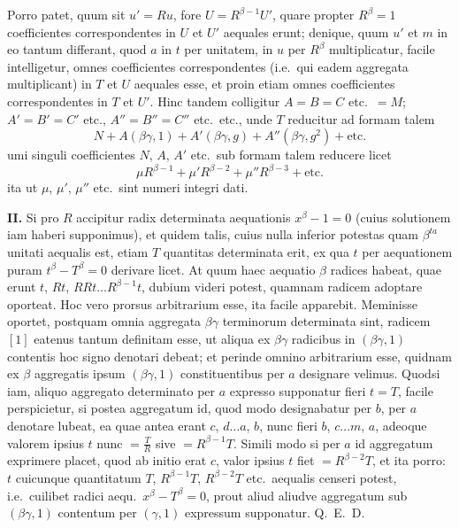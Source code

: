 \documentclass[12pt,a4paper]{article}
\theoremstyle{plain}
\theoremstyle{definition}
\theoremstyle{remark}
\begin{document}
Porro patet, quum sit $u' = Ru$, fore $U = R^{\beta-1}U'$, quare propter $R^\beta = 1$ coefficientes correspondentes in $U$ et $U'$ aequales erunt; denique, quum $u'$ et $m$ in eo tantum differant, quod $a$ in $t$ per unitatem, in $u$ per $R^\beta$ multiplicatur, facile intelligetur, omnes coefficientes correspondentes (i.e.\ qui eadem aggregata multiplicant) in $T$ et $U$ aequales esse, et proin etiam omnes coefficientes correspondentes in $T$ et $U'$. Hinc tandem colligitur $A = B = C$ etc.\ $= M$; $A' = B' = C'$ etc., $A'' = B'' = C''$ etc.\ etc., unde $T$ reducitur ad formam talem
\[N + A(\beta\gamma, 1) + A'(\beta\gamma, g) + A''(\beta\gamma, g^2) + \text{etc.}\]
umi singuli coefficientes $N$, $A$, $A'$ etc.\ sub formam talem reducere licet
\[\mu R^{\beta-1} + \mu' R^{\beta-2} + \mu'' R^{\beta-3} + \text{etc.}\]
ita ut $\mu$, $\mu'$, $\mu''$ etc.\ sint numeri integri dati.

\textbf{II.} Si pro $R$ accipitur radix determinata aequationis $x^\beta - 1 = 0$ (cuius solutionem iam haberi supponimus), et quidem talis, cuius nulla inferior potestas quam $\beta^{ta}$ unitati aequalis est, etiam $T$ quantitas determinata erit, ex qua $t$ per aequationem puram $t^\beta - T^\beta = 0$ derivare licet. At quum haec aequatio $\beta$ radices habeat, quae erunt $t$, $Rt$, $RRt \ldots R^{\beta-1}t$, dubium videri potest, quamnam radicem adoptare oporteat. Hoc vero prorsus arbitrarium esse, ita facile apparebit. Meminisse oportet, postquam omnia aggregata $\beta\gamma$ terminorum determinata sint, radicem $[1]$ eatenus tantum definitam esse, ut aliqua ex $\beta\gamma$ radicibus in $(\beta\gamma, 1)$ contentis hoc signo denotari debeat; et perinde omnino arbitrarium esse, quidnam ex $\beta$ aggregatis ipsum $(\beta\gamma, 1)$ constituentibus per $a$ designare velimus. Quodsi iam, aliquo aggregato determinato per $a$ expresso supponatur fieri $t = T$, facile perspicietur, si postea aggregatum id, quod modo designabatur per $b$, per $a$ denotare lubeat, ea quae antea erant $c$, $d \ldots a$, $b$, nunc fieri $b$, $c \ldots m$, $a$, adeoque valorem ipsius $t$ nunc $= \tfrac{T}{R}$ sive $= R^{\beta-1}T$. Simili modo si per $a$ id aggregatum exprimere placet, quod ab initio erat $c$, valor ipsius $t$ fiet $= R^{\beta-2}T$, et ita porro: $t$ cuicunque quantitatum $T$, $R^{\beta-1}T$, $R^{\beta-2}T$ etc.\ aequalis censeri potest, i.e.\ cuilibet radici aequ.\ $x^\beta - T^\beta = 0$, prout aliud aliudve aggregatum sub $(\beta\gamma, 1)$ contentum per $(\gamma, 1)$ expressum supponatur. \hfill Q.\ E.\ D.
\end{document}
